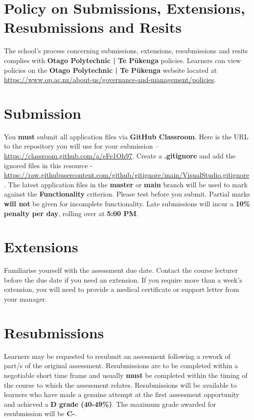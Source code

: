 \documentclass{article}
\begin{document}
\section*{Policy on Submissions, Extensions, Resubmissions and Resits}
The school's process concerning submissions, extensions, resubmissions and resits complies with \textbf{Otago Polytechnic | Te Pūkenga} policies. Learners can view policies on the \textbf{Otago Polytechnic | Te Pūkenga} website located at \href{https://www.op.ac.nz/about-us/governance-and-management/policies}{https://www.op.ac.nz/about-us/governance-and-management/policies}.

\section*{Submission}
You \textbf{must} submit all application files via \textbf{GitHub Classroom}. Here is the URL to the repository you will use for your submission – \href{https://classroom.github.com/a/eFe1Oh97}{https://classroom.github.com/a/eFe1Oh97}.  Create a \textbf{.gitignore} and add the ignored files in this resource - \href{https://raw.githubusercontent.com/github/gitignore/main/VisualStudio.gitignore}{https://raw.githubusercontent.com/github/gitignore/main/VisualStudio.gitignore}. The latest application files in the \textbf{master} or \textbf{main} branch will be used to mark against the \textbf{Functionality} criterion. Please test before you submit. Partial marks \textbf{will not} be given for incomplete functionality. Late submissions will incur a \textbf{10\% penalty per day}, rolling over at \textbf{5:00 PM}.

\section*{Extensions}
Familiarise yourself with the assessment due date. Contact the course lecturer before the due date if you need an extension. If you require more than a week's extension, you will need to provide a medical certificate or support letter from your manager.

\section*{Resubmissions}
Learners may be requested to resubmit an assessment following a rework of part/s of the original assessment. Resubmissions are to be completed within a negotiable short time frame and usually \textbf{must} be completed within the timing of the course to which the assessment relates. Resubmissions will be available to learners who have made a genuine attempt at the first assessment opportunity and achieved a \textbf{D grade (40-49\%)}. The maximum grade awarded for resubmission will be \textbf{C-}.
\end{document}
